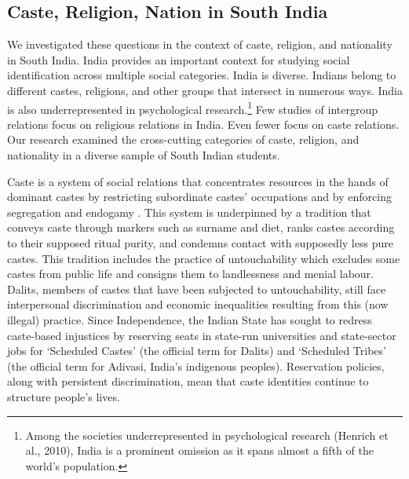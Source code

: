 \documentclass[12pt, a4paper]{article}
\begin{document}
\subsection{Caste, Religion, Nation in South India}

We investigated these questions in the context of caste, religion, and nationality in South India. India provides an important context for studying social identification across multiple social categories. India is diverse. Indians belong to different castes, religions, and other groups that intersect in numerous ways. India is also underrepresented in psychological research.\footnote{Among the societies underrepresented in psychological research (Henrich et al., 2010), India is a prominent omission as it spans almost a fifth of the world’s population.} Few studies of intergroup relations \parencite[e.g.,][]{ghosh_hindu-muslim_1991, tausch_relationships_2009} focus on religious relations in India. Even fewer \parencite[e.g.,][]{cotterill_ideological_2014} focus on caste relations. Our research examined the cross-cutting categories of caste, religion, and nationality in a diverse sample of South Indian students.

Caste is a system of social relations that concentrates resources in the hands of dominant castes by restricting subordinate castes’ occupations and by enforcing segregation and endogamy \parencite{jodhka_caste_2012}. This system is underpinned by a tradition that conveys caste through markers such as surname and diet, ranks castes according to their supposed ritual purity, and condemns contact with supposedly less pure castes. This tradition includes the practice of untouchability which excludes some castes from public life and consigns them to landlessness and menial labour. Dalits, members of castes that have been subjected to untouchability, still face interpersonal discrimination and economic inequalities resulting from this (now illegal) practice. Since Independence, the Indian State has sought to redress caste-based injustices by reserving seats in state-run universities and state-sector jobs for ‘Scheduled Castes’ (the official term for Dalits) and ‘Scheduled Tribes’ (the official term for Adivasi, India’s indigenous peoples). Reservation policies, along with persistent discrimination, mean that caste identities continue to structure people’s lives.
\end{document}
